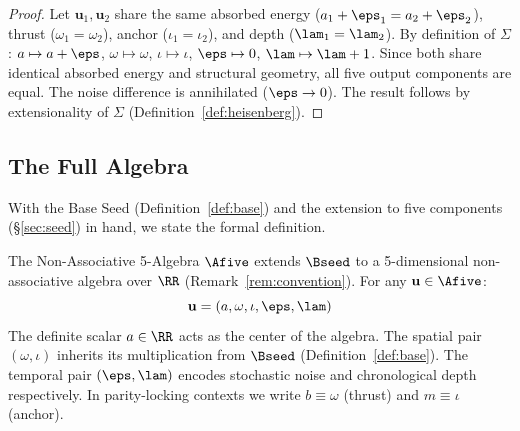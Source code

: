 \begin{proof}
Let $\mathbf{u}_1, \mathbf{u}_2$ share the same absorbed energy ($a_1 + \eps_1 = a_2 + \eps_2$), thrust ($\omega_1 = \omega_2$), anchor ($\iota_1 = \iota_2$), and depth ($\lam_1 = \lam_2$). By definition of $\Sigma$: $a \mapsto a + \eps$, $\omega \mapsto \omega$, $\iota \mapsto \iota$, $\eps \mapsto 0$, $\lam \mapsto \lam + 1$. Since both share identical absorbed energy and structural geometry, all five output components are equal. The noise difference is annihilated ($\eps \to 0$). The result follows by extensionality of $\Sigma$ (Definition~\ref{def:heisenberg}). \qedhere
\end{proof}

\subsection{The Full Algebra}

With the Base Seed (Definition~\ref{def:base}) and the extension to five components (\S\ref{sec:seed}) in hand, we state the formal definition.

\begin{definition}\label{def:heisenberg}
The Non-Associative 5-Algebra $\Afive$ extends $\Bseed$ to a 5-dimensional non-associative algebra over $\RR$ (Remark~\ref{rem:convention}). For any $\mathbf{u} \in \Afive$:
$$\mathbf{u} = (a, \omega, \iota, \eps, \lam)$$
The definite scalar $a \in \RR$ acts as the center of the algebra. The spatial pair $(\omega, \iota)$ inherits its multiplication from $\Bseed$ (Definition~\ref{def:base}). The temporal pair $(\eps, \lam)$ encodes stochastic noise and chronological depth respectively. In parity-locking contexts we write $b \equiv \omega$ (thrust) and $m \equiv \iota$ (anchor).
\end{definition}
